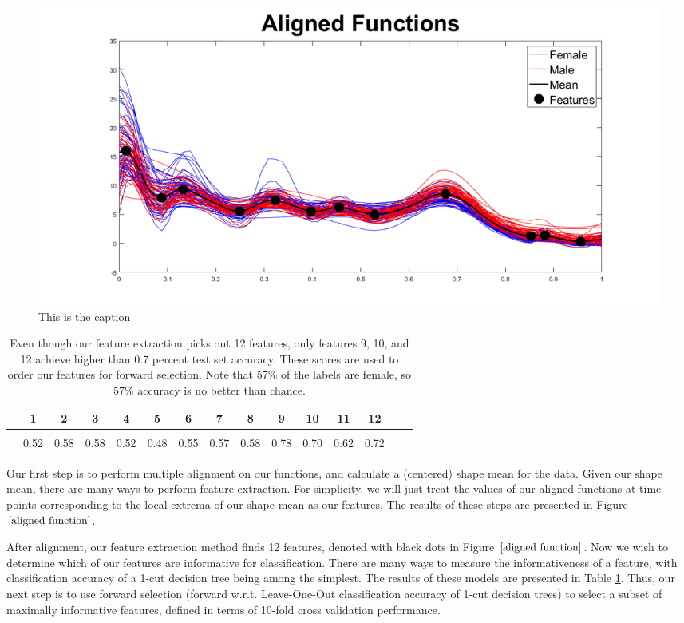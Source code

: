 \documentclass[]{article}
\begin{document}
\begin{center}
	\begin{figure}
		\includegraphics[width = \linewidth]{./Aligned Functions.png}
		\caption{This is the caption}
		\label{aligned function}
	\end{figure}
\end{center}
\begin{table}
	\begin{tabular}{|c|c|c|c|c|c|c|c|c|c|c|c|c|c|c|}
		\hline
		\text{Feature:}& 1 & 2 & 3 & 4 & 5 & 6 & 7 & 8 & 9 & 10 & 11 & 12\\
		\hline
		\text{1-cut Tree }&  &  &  &  &  &  &  &  &  &  &  & \\ 
		\text{LOO Accuracy:}& 0.52 & 0.58 & 0.58 & 0.52 & 0.48 & 0.55 & 0.57 & 0.58 & 0.78 & 0.70 & 0.62 & 0.72\\ 
		\hline
	\end{tabular}
	\caption{Even though our feature extraction picks out 12 features, only features 9, 10, and 12 achieve higher than 0.7 percent test set accuracy. These scores are used to order our features for forward selection. Note that 57\% of the labels are female, so 57\% accuracy is no better than chance.}
	\label{feature_LOO}
\end{table}


Our first step is to perform multiple alignment on our functions, and calculate a (centered) shape mean for the data. Given our shape mean, there are many ways to perform feature extraction. For simplicity, we will just treat the values of our aligned functions at time points corresponding to the local extrema of our shape mean as our features. The results of these steps are presented in Figure $\ref{aligned function}$. 

After alignment, our feature extraction method finds 12 features, denoted with black dots in Figure $\ref{aligned function}$. Now we wish to determine which of our features are informative for classification. There are many ways to measure the informativeness of a feature, with classification accuracy of a 1-cut decision tree being among the simplest. The results of these models are presented in Table \ref{feature_LOO}. Thus, our next step is to use forward selection (forward w.r.t. Leave-One-Out classification accuracy of 1-cut decision trees) to select a subset of maximally informative features, defined in terms of 10-fold cross validation performance.
\end{document}
